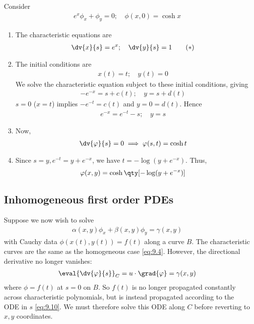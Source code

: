 \begin{example}
	Consider
	\begin{align*}
		e^x \phi_x + \phi_y = 0;\quad \phi(x,0) = \cosh x
	\end{align*}
    \begin{enumerate}
        \item The characteristic equations are
        \begin{align*}
            \dv{x}{s} = e^x;\quad \dv{y}{s} = 1 \tag{$\ast$}
        \end{align*}
        \item The initial conditions are
        \begin{align*}
            x(t) = t;\quad y(t) = 0 \tag{$\dagger$}
        \end{align*}
        We solve the characteristic equation subject to these initial conditions, giving
        \begin{align*}
            -e^{-x} = s + c(t);\quad y = s + d(t)
        \end{align*}
        $s = 0$ ($x = t$) implies $-e^{-t} = c(t)$ and $y = 0 = d(t)$.
        Hence
        \begin{align*}
            e^{-x} = e^{-t} - s;\quad y = s
        \end{align*}
        \item Now,
        \begin{align*}
            \dv{\phi}{s} = 0 \implies \phi(s,t) = \cosh t
        \end{align*}
        \item Since $s = y, e^{-t} = y + e^{-x}$, we have $t = -\log(y + e^{-x})$.
        Thus,
        \begin{align*}
            \phi(x,y) = \cosh\qty[-\log(y + e^{-x})]
        \end{align*}
    \end{enumerate} 

\end{example}

\subsection{Inhomogeneous first order PDEs}
Suppose we now wish to solve
\begin{align} \label{eq:9.9}
	\alpha(x,y) \phi_x + \beta(x,y) \phi_y = \gamma(x,y)
\end{align}
with Cauchy data $\phi(x(t), y(t)) = f(t)$ along a curve $B$.
The characteristic curves are the same as the homogeneous case \cref{eq:9.4}.
However, the directional derivative no longer vanishes:
\begin{align} \label{eq:9.10}
	\eval{\dv{\phi}{s}}_C = u \cdot \grad{\phi} = \gamma(x,y)
\end{align}
where $\phi = f(t)$ at $s = 0$ on $B$.
So $f(t)$ is no longer propagated constantly across characteristic polynomials, but is instead propagated according to the ODE in $s$ \cref{eq:9.10}.
We must therefore solve this ODE along $C$ before reverting to $x,y$ coordinates.

